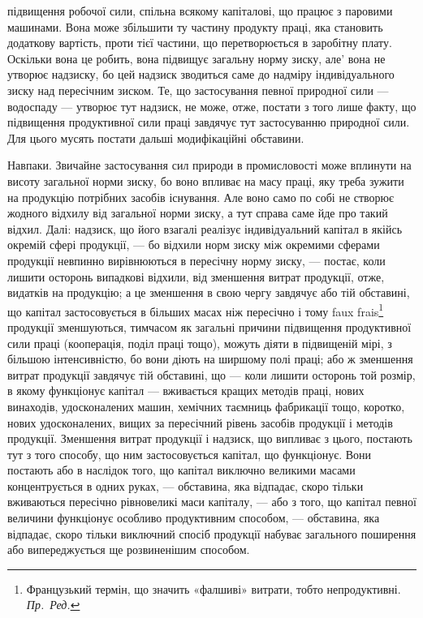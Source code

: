 \parcont{}  %
підвищення робочої сили, спільна всякому капіталові, що працює з паровими
машинами. Вона може збільшити ту частину продукту праці, яка становить
додаткову вартість, проти тієї частини, що перетворюється в заробітну плату.
Оскільки вона це робить, вона підвищує загальну норму зиску, але' вона не
утворює надзиску, бо цей надзиск зводиться саме до надміру індивідуального
зиску над пересічним зиском. Те, що застосування певної природної сили — водоспаду
— утворює тут надзиск, не може, отже, постати з того лише факту, що
підвищення продуктивної сили праці завдячує тут застосуванню природної сили.
Для цього мусять постати дальші модифікаційні обставини.

Навпаки. Звичайне застосування сил природи в промисловості може вплинути
на висоту загальної норми зиску, бо воно впливає на масу праці, яку
треба зужити на продукцію потрібних засобів існування. Але воно само по собі не
створює жодного відхилу від загальної норми зиску, а тут справа саме йде
про такий відхил. Далі: надзиск, що його взагалі реалізує індивідуальний капітал
в якійсь окремій сфері продукції, — бо відхили норм зиску між окремими сферами
продукції невпинно вирівнюються в пересічну норму зиску, — постає, коли лишити
осторонь випадкові відхили, від зменшення витрат продукції, отже, видатків на
продукцію; а це зменшення в свою чергу завдячує або тій обставині, що
капітал застосовується в більших масах ніж пересічно і тому faux frais\footnote*{
Французький термін, що значить «фалшиві» витрати, тобто непродуктивні. \emph{Пр.~Ред.}
}
продукції зменшуються, тимчасом як загальні причини підвищення продуктивної
сили праці (кооперація, поділ праці тощо), можуть діяти в підвищеній мірі, з
більшою інтенсивністю, бо вони діють на ширшому полі праці; або ж зменшення
витрат продукції завдячує тій обставині, що — коли лишити осторонь той розмір,
в якому функціонує капітал — вживається кращих методів праці, нових винаходів,
удосконалених машин, хемічних таємниць фабрикації тощо, коротко, нових
удосконалених, вищих за пересічний рівень засобів продукції і методів продукції.
Зменшення витрат продукції і надзиск, що випливає з цього, постають тут
з того способу, що ним застосовується капітал, що функціонує. Вони постають
або в наслідок того, що капітал виключно великими масами концентрується в
одних руках, — обставина, яка відпадає, скоро тільки вживаються пересічно
рівновеликі маси капіталу, — або з того, що капітал певної величини функціонує
особливо продуктивним способом, — обставина, яка відпадає, скоро тільки
виключний спосіб продукції набуває загального поширення або випереджується
ще розвиненішим способом.

